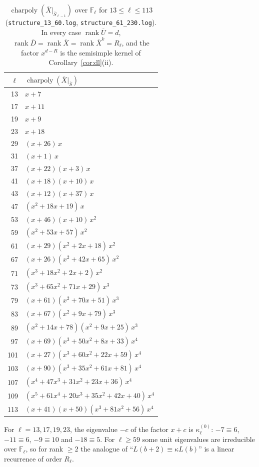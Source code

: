 \documentclass[11pt]{amsart}
\newcommand{\Fl}{\mathbb{F}_\ell}
\newcommand{\Sb}{\overline{S}}
\newcommand{\Ub}{\overline{U}}
\newcommand{\Db}{\overline{D}}
\newcommand{\Xb}{\overline{X}}
\DeclareMathOperator{\rank}{rank}
\DeclareMathOperator{\charpoly}{charpoly}
\theoremstyle{plain}
\theoremstyle{definition}
\numberwithin{equation}{section}
\begin{document}
\begin{table}[ht]
\centering\small
\caption{$\charpoly(\Xb|_{\Sb_{\ell-1}})$ over $\Fl$ for $13\le\ell\le113$ (\texttt{structure\_13\_60.log},
\texttt{structure\_61\_230.log}). In every case $\rank\Ub=d$, $\rank\Db=\rank\Xb=\rank\Xb^k=R_\ell$, and the factor $x^{d-R}$ is
the semisimple kernel of Corollary~\ref{cor:dl}(ii).}\label{tab:charpoly}
\begin{tabular}{@{}rl@{}}
\toprule
$\ell$ & $\charpoly(\Xb|_{\Sb})$\\
\midrule
13 & $x+7$\\
17 & $x+11$\\
19 & $x+9$\\
23 & $x+18$\\
29 & $(x+26)\,x$\\
31 & $(x+1)\,x$\\
37 & $(x+22)(x+3)\,x$\\
41 & $(x+18)(x+10)\,x$\\
43 & $(x+12)(x+37)\,x$\\
47 & $(x^2+18x+19)\,x$\\
53 & $(x+46)(x+10)\,x^2$\\
59 & $(x^2+53x+57)\,x^2$\\
61 & $(x+29)(x^2+2x+18)\,x^2$\\
67 & $(x+26)(x^2+42x+65)\,x^2$\\
71 & $(x^3+18x^2+2x+2)\,x^2$\\
73 & $(x^3+65x^2+71x+29)\,x^3$\\
79 & $(x+61)(x^2+70x+51)\,x^3$\\
83 & $(x+67)(x^2+9x+79)\,x^3$\\
89 & $(x^2+14x+78)(x^2+9x+25)\,x^3$\\
97 & $(x+69)(x^3+50x^2+8x+33)\,x^4$\\
101 & $(x+27)(x^3+60x^2+22x+59)\,x^4$\\
103 & $(x+90)(x^3+35x^2+61x+81)\,x^4$\\
107 & $(x^4+47x^3+31x^2+23x+36)\,x^4$\\
109 & $(x^5+61x^4+20x^3+35x^2+42x+40)\,x^4$\\
113 & $(x+41)(x+50)(x^3+81x^2+56)\,x^4$\\
\bottomrule
\end{tabular}
\end{table}
For $\ell=13,17,19,23$, the eigenvalue $-c$ of the factor $x+c$ is $\kappa^{(0)}_\ell$: $-7\equiv6$, $-11\equiv6$, $-9\equiv10$ and
$-18\equiv5$. For $\ell\ge59$ some unit eigenvalues are irreducible over $\Fl$, so for rank $\ge2$ the analogue of
``$L(b+2)\equiv\kappa L(b)$'' is a linear recurrence of order $R_\ell$.
\end{document}
